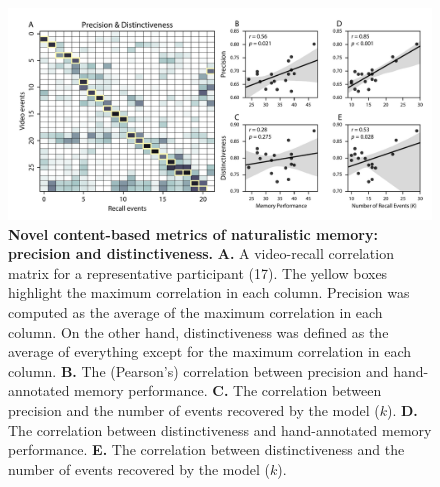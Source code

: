 \documentclass{article}
\begin{document}
\begin{figure}[tp]
  \centering
  \includegraphics[width=1\textwidth]{figs/precision_distinctiveness}
  \caption{\small \textbf{Novel content-based metrics of naturalistic memory: precision and distinctiveness.} \textbf{A.} A video-recall correlation matrix for a representative participant (17).  The yellow boxes highlight the maximum correlation in each column.  Precision was computed as the average of the maximum correlation in each column.  On the other hand, distinctiveness was defined as the average of everything except for the maximum correlation in each column. \textbf{B.} The (Pearson's) correlation between precision and hand-annotated memory performance. \textbf{C.} The correlation between precision and the number of events recovered by the model ($k$). \textbf{D.} The correlation between distinctiveness and hand-annotated memory performance. \textbf{E.} The correlation between distinctiveness and the number of events recovered by the model ($k$).}
  \label{fig:precision-distinctiveness}
\end{figure}
\end{document}

